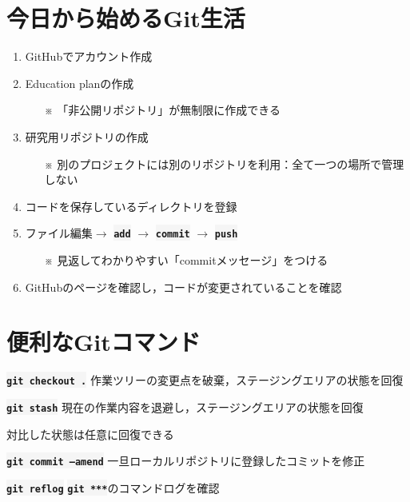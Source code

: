 \documentclass[12pt,dvipdfmx,svgnames,uplatex,aspectratio=169]{beamer}
\newcommand{\git}[1]{{\colorbox{WhiteSmoke}{\texttt{\textbf{#1}}}}}  %
\begin{document}
\section{今日から始めるGit生活}
\begin{frame}{\insertsection}
  \begin{enumerate}
    \item GitHubでアカウント作成
    \item Education planの作成
    \begin{itemize}
      \item[※] 「非公開リポジトリ」が無制限に作成できる
    \end{itemize}
    \item 研究用リポジトリの作成
    \begin{itemize}
      \item[※] 別のプロジェクトには別のリポジトリを利用：全て一つの場所で管理しない
    \end{itemize}
    \item コードを保存しているディレクトリを登録
    \item ファイル編集\(\to\) \git{add} \(\to\) \git{commit} \(\to\) \git{push}
    \begin{itemize}
      \item[※] 見返してわかりやすい「commitメッセージ」をつける
    \end{itemize}
    \item GitHubのページを確認し，コードが変更されていることを確認
  \end{enumerate}
\end{frame}

\section{便利なGitコマンド}
\begin{frame}{\insertsection}
  \begin{block}{\git{git checkout .}}
    作業ツリーの変更点を破棄，ステージングエリアの状態を回復
  \end{block}
  \begin{block}{\git{git stash}}
    現在の作業内容を退避し，ステージングエリアの状態を回復

    対比した状態は任意に回復できる
  \end{block}
  \begin{block}{\git{git commit --amend}}
    一旦ローカルリポジトリに登録したコミットを修正
  \end{block}
  \begin{block}{\git{git reflog}}
    \git{git ***}のコマンドログを確認
  \end{block}

\end{frame}
\end{document}
